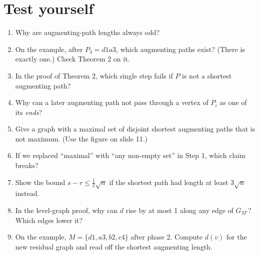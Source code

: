 \documentclass[11pt,a4paper]{article}
\begin{document}
\section{Test yourself}
\begin{enumerate}[label=\textbf{Q\arabic*.},leftmargin=2.4em,itemsep=6pt]
\item Why are augmenting-path lengths always odd?
\item On the example, after $P_3=d1a3$, which augmenting paths exist? (There is exactly one.) Check Theorem 2 on it.
\item In the proof of Theorem 2, which single step fails if $P$ is not a shortest augmenting path?
\item Why can a later augmenting path not pass through a vertex of $P_i$ as one of its \emph{ends}?
\item Give a graph with a maximal set of disjoint shortest augmenting paths that is not maximum. (Use the figure on slide 11.)
\item If we replaced ``maximal'' with ``any non-empty set'' in Step 1, which claim breaks?
\item Show the bound $s-r\le\frac12\sqrt n$ if the shortest path had length at least $3\sqrt n$ instead.
\item In the level-graph proof, why can $d$ rise by at most 1 along any edge of $G_{M'}$? Which edges lower it?
\item On the example, $M=\{d1,a3,b2,c4\}$ after phase 2. Compute $d(v)$ for the new residual graph and read off the shortest augmenting length.
\end{enumerate}
\end{document}

